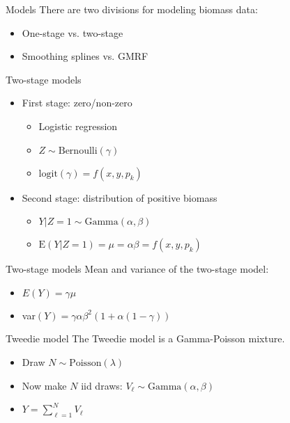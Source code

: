 \documentclass{beamer}
\begin{document}
\begin{frame}{Models}
  There are two divisions for modeling biomass data:
  \begin{itemize}
    \item One-stage vs. two-stage
    \item Smoothing splines vs. GMRF
   \end{itemize}
\end{frame}


\begin{frame}[fragile]{Two-stage models}
  \begin{itemize}
    \item First stage: zero/non-zero
    \begin{itemize}
      \item Logistic regression
      \item $Z \sim \text{Bernoulli}(\gamma)$
      \item $\text{logit}(\gamma) = f(x,y,p_k)$
    \end{itemize}
    \item Second stage: distribution of positive biomass
    \begin{itemize}
      \item $Y|Z=1 \sim \text{Gamma}(\alpha, \beta)$
      \item $\text{E}\left(Y|Z=1\right) = \mu = \alpha \beta = f(x,y,p_k)$
    \end{itemize}
  \end{itemize}
\end{frame}


\begin{frame}[fragile]{Two-stage models}
  Mean and variance of the two-stage model:\\
  \begin{itemize}
    \item $E(Y) = \gamma \mu$
    \item var$(Y) = \gamma \alpha \beta^2 \left(1 + \alpha(1-\gamma)\right) $
  \end{itemize}
\end{frame}



\begin{frame}[fragile]{Tweedie model}
  The Tweedie model is a Gamma-Poisson mixture.\\
  \begin{itemize}
    \item Draw $N \sim \text{Poisson}(\lambda)$
    \item Now make $N$ iid draws: $V_{\ell} \sim \text{Gamma}(\alpha, \beta)$
    \item $Y = \sum\limits_{\ell=1}^N  V_{\ell}$
  \end{itemize}
\end{frame}
\end{document}

